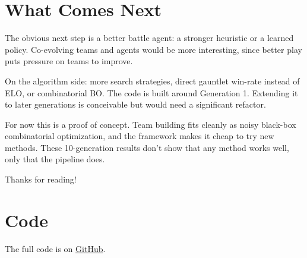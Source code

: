 \documentclass{article}
\begin{document}
\section{What Comes Next}

The obvious next step is a better battle agent: a stronger heuristic or a learned policy. Co-evolving teams and agents would be more interesting, since better play puts pressure on teams to improve.

On the algorithm side: more search strategies, direct gauntlet win-rate instead of ELO, or combinatorial BO. The code is built around Generation 1. Extending it to later generations is conceivable but would need a significant refactor.

For now this is a proof of concept. Team building fits cleanly as noisy black-box combinatorial optimization, and the framework makes it cheap to try new methods. These 10-generation results don't show that any method works well, only that the pipeline does.

Thanks for reading!

\section{Code}

The full code is on \href{https://github.com/nathan-cantafio/pokemon}{GitHub}.
\end{document}
